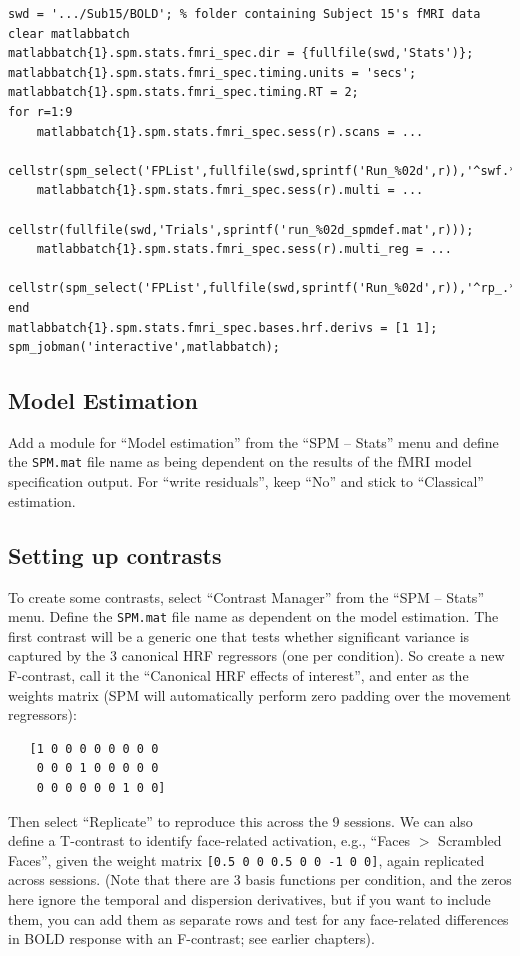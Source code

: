 \begin{lstlisting}[style=Matlab-editor,basicstyle=\mlttfamily\footnotesize]
swd = '.../Sub15/BOLD'; % folder containing Subject 15's fMRI data
clear matlabbatch
matlabbatch{1}.spm.stats.fmri_spec.dir = {fullfile(swd,'Stats')};
matlabbatch{1}.spm.stats.fmri_spec.timing.units = 'secs';
matlabbatch{1}.spm.stats.fmri_spec.timing.RT = 2;
for r=1:9
    matlabbatch{1}.spm.stats.fmri_spec.sess(r).scans = ...
        cellstr(spm_select('FPList',fullfile(swd,sprintf('Run_%02d',r)),'^swf.*\.nii'));
    matlabbatch{1}.spm.stats.fmri_spec.sess(r).multi = ...
        cellstr(fullfile(swd,'Trials',sprintf('run_%02d_spmdef.mat',r)));
    matlabbatch{1}.spm.stats.fmri_spec.sess(r).multi_reg = ...
        cellstr(spm_select('FPList',fullfile(swd,sprintf('Run_%02d',r)),'^rp_.*\.txt'));
end
matlabbatch{1}.spm.stats.fmri_spec.bases.hrf.derivs = [1 1];
spm_jobman('interactive',matlabbatch);
\end{lstlisting}

\subsection{Model Estimation}

Add a module for ``Model estimation'' from the ``SPM -- Stats'' menu and define the \texttt{SPM.mat} file name as being dependent on the results of the fMRI model specification output. For ``write residuals'', keep ``No'' and stick to ``Classical'' estimation.

\subsection{Setting up contrasts}

To create some contrasts, select ``Contrast Manager'' from the ``SPM -- Stats'' menu. Define the \texttt{SPM.mat} file name as dependent on the model estimation. The first contrast will be a generic one that tests whether significant variance is captured by the 3 canonical HRF regressors (one per condition). So create a new F-contrast, call it the ``Canonical HRF effects of interest'', and enter as the weights matrix (SPM will automatically perform zero padding over the movement regressors):
\begin{verbatim}
   [1 0 0 0 0 0 0 0 0
    0 0 0 1 0 0 0 0 0
    0 0 0 0 0 0 1 0 0]
\end{verbatim}
Then select ``Replicate'' to reproduce this across the 9 sessions. We can also define a T-contrast to identify face-related activation, e.g., ``Faces \(>\) Scrambled Faces'', given the weight matrix \texttt{[0.5 0 0  0.5 0 0  -1 0 0]}, again replicated across sessions. (Note that there are 3 basis functions per condition, and the zeros here ignore the temporal and dispersion derivatives, but if you want to include them, you can add them as separate rows and test for any face-related differences in BOLD response with an F-contrast; see earlier chapters).

